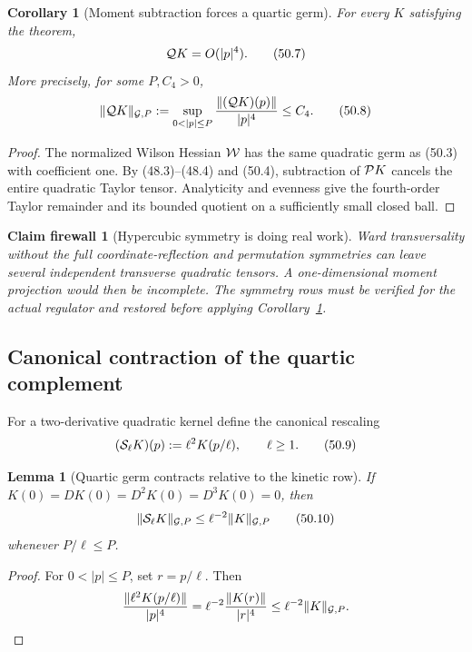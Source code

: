 \documentclass[11pt,oneside]{book}
\newtheorem{lemma}[theorem]{Lemma}
\newtheorem{corollary}[theorem]{Corollary}
\newtheorem{firewall}[theorem]{Claim firewall}
\theoremstyle{definition}
\theoremstyle{remark}
\begin{document}
\begin{corollary}[Moment subtraction forces a quartic germ]
\label{cor:e8v50-quartic-after-projection}
For every \(K\) satisfying the theorem,
\[
 {\cal Q}K=O(|p|^4).                                         \tag{50.7}
\]
More precisely, for some \(P,C_4>0\),
\[
 \|{\cal Q}K\|_{{\cal G},P}
 :=\sup_{0<|p|\le P}
 \frac{\|({\cal Q}K)(p)\|}{|p|^4}
 \le C_4.                                                     \tag{50.8}
\]
\end{corollary}

\begin{proof}
The normalized Wilson Hessian \({\cal W}\) has the same quadratic
germ as (50.3) with coefficient one.  By (48.3)--(48.4) and
(50.4), subtraction of \({\cal P}K\) cancels the entire quadratic
Taylor tensor.  Analyticity and evenness give the fourth-order
Taylor remainder and its bounded quotient on a sufficiently small
closed ball.
\end{proof}

\begin{firewall}[Hypercubic symmetry is doing real work]
\label{fire:e8v50-hypercubic}
Ward transversality without the full coordinate-reflection and
permutation symmetries can leave several independent transverse
quadratic tensors.  A one-dimensional moment projection would then
be incomplete.  The symmetry rows must be verified for the actual
regulator and restored before applying
Corollary~\ref{cor:e8v50-quartic-after-projection}.
\end{firewall}

\subsection{Canonical contraction of the quartic complement}

For a two-derivative quadratic kernel define the canonical
rescaling
\[
 ({\cal S}_\ell K)(p):=\ell^2K(p/\ell),\qquad\ell\ge1.         \tag{50.9}
\]

\begin{lemma}[Quartic germ contracts relative to the kinetic row]
\label{lem:e8v50-quartic-rescaling}
If \(K(0)=D K(0)=D^2K(0)=D^3K(0)=0\), then
\[
 \|{\cal S}_\ell K\|_{{\cal G},P}
 \le\ell^{-2}\|K\|_{{\cal G},P}                              \tag{50.10}
\]
whenever \(P/\ell\le P\).
\end{lemma}

\begin{proof}
For \(0<|p|\le P\), set \(r=p/\ell\).  Then
\[
 \frac{\|\ell^2K(p/\ell)\|}{|p|^4}
 =\ell^{-2}\frac{\|K(r)\|}{|r|^4}
 \le\ell^{-2}\|K\|_{{\cal G},P}.
\]
\end{proof}
\end{document}
